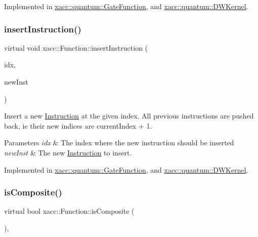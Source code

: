 Implemented in \hyperlink{a01011_aebce6a9e64aed7f4aff86df752bacfe2}{xacc\+::quantum\+::\+Gate\+Function}, and \hyperlink{a00983_abbb8f2b1c78623c377524e45d581d018}{xacc\+::quantum\+::\+D\+W\+Kernel}.

\mbox{\label{a01151_acde702e44bdbc2759b338365218d7ebe}} 
\subsubsection{\texorpdfstring{insert\+Instruction()}{insertInstruction()}}
{\footnotesize\ttfamily virtual void xacc\+::\+Function\+::insert\+Instruction (\begin{DoxyParamCaption}\item[{const int}]{idx,  }\item[{Inst\+Ptr}]{new\+Inst }\end{DoxyParamCaption})\hspace{0.3cm}{\ttfamily [pure virtual]}}

Insert a new \hyperlink{a01155}{Instruction} at the given index. All previous instructions are pushed back, ie their new indices are current\+Index + 1.


\begin{DoxyParams}{Parameters}
{\em idx} & The index where the new instruction should be inserted \\
\hline
{\em new\+Inst} & The new \hyperlink{a01155}{Instruction} to insert. \\
\hline
\end{DoxyParams}


Implemented in \hyperlink{a01011_aed3b963f1c4eb3215ca46af48d78f588}{xacc\+::quantum\+::\+Gate\+Function}, and \hyperlink{a00983_a1627af0141f70fc4a3cd500a13fb31b8}{xacc\+::quantum\+::\+D\+W\+Kernel}.

\mbox{\label{a01151_aa75500c657b5c3e0e36213e1506aad97}} 
\subsubsection{\texorpdfstring{is\+Composite()}{isComposite()}}
{\footnotesize\ttfamily virtual bool xacc\+::\+Function\+::is\+Composite (\begin{DoxyParamCaption}{ }\end{DoxyParamCaption})\hspace{0.3cm}{\ttfamily [inline]}, {\ttfamily [virtual]}}

